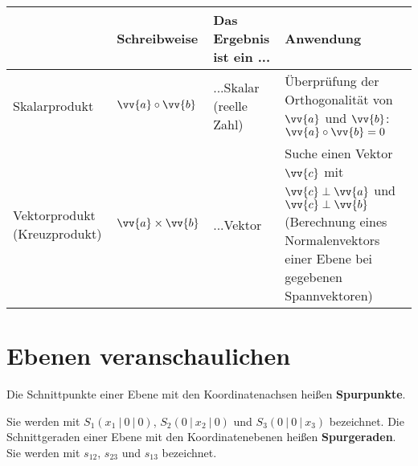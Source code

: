 \begin{center}
    \begin{tabular} { | p{} | p{} | p{} | p{} | }
     \hline
      & Schreibweise & Das Ergebnis ist ein ... & Anwendung \\
     \hline
     Skalarprodukt  &  $\vv{a} \circ \vv{b}$\footnotemark &  ...Skalar (reelle Zahl) & Überprüfung der Orthogonalität von $\vv{a}$ und $\vv{b}$: $\vv{a} \circ \vv{b} = 0$  \\
     \hline
     Vektorprodukt (Kreuzprodukt) & $\vv{a} \times \vv{b}$ & ...Vektor & Suche einen Vektor $\vv{c}$ mit $\vv{c} \perp \vv{a}$ und $\vv{c} \perp \vv{b}$ \newline (Berechnung eines Normalenvektors einer Ebene bei gegebenen Spannvektoren)  \\
    \hline
    \end{tabular}
\end{center}


\section{Ebenen veranschaulichen}

\begin{definition}
    Die Schnittpunkte einer Ebene mit den Koordinatenachsen heißen \textbf{Spurpunkte}. 

    Sie werden mit $S_1(x_1 \ | \ 0 \ | \ 0)$, $S_2(0 \ | \ x_2 \ | \ 0)$ und $S_3(0 \ | \ 0 \ | \ x_3)$ bezeichnet. Die Schnittgeraden einer Ebene mit den Koordinatenebenen heißen \textbf{Spurgeraden}. Sie werden mit $s_{12}$, $s_{23}$ und $s_{13}$ bezeichnet.
\end{definition}


